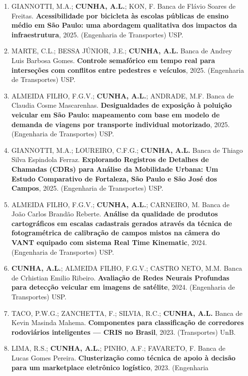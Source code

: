 \documentclass[
  brazilian,
  11pt,
  a4paper,
]{article}
\begin{document}
\begin{enumerate}
\def\labelenumi{\arabic{enumi}.}
\item
  GIANNOTTI, M.A.; \textbf{CUNHA, A.L.}; KON, F. Banca de Flávio Soares
  de Freitas. \textbf{Acessibilidade por bicicleta às escolas públicas
  de ensino médio em São Paulo: uma abordagem qualitativa dos impactos
  da infraestrutura}, 2025. (Engenharia de Transportes) USP.
\item
  MARTE, C.L.; BESSA JÚNIOR, J.E.; \textbf{CUNHA, A.L.} Banca de Andrey
  Luis Barbosa Gomes. \textbf{Controle semafórico em tempo real para
  interseções com conflitos entre pedestres e veículos}, 2025.
  (Engenharia de Transportes) USP.
\item
  ALMEIDA FILHO, F.G.V.; \textbf{CUNHA, A.L.}; ANDRADE, M.F. Banca de
  Claudia Cosme Mascarenhas. \textbf{Desigualdades de exposição à
  poluição veicular em São Paulo: mapeamento com base em modelo de
  demanda de viagens por transporte individual motorizado}, 2025.
  (Engenharia de Transportes) USP.
\item
  GIANNOTTI, M.A.; LOUREIRO, C.F.G.; \textbf{CUNHA, A.L.} Banca de
  Thiago Silva Espindola Ferraz. \textbf{Explorando Registros de
  Detalhes de Chamadas (CDRs) para Análise da Mobilidade Urbana: Um
  Estudo Comparativo de Fortaleza, São Paulo e São José dos Campos},
  2025. (Engenharia de Transportes) USP.
\item
  ALMEIDA FILHO, F.G.V.; \textbf{CUNHA, A.L.}; CARNEIRO, M. Banca de
  João Carlos Brandão Reberte. \textbf{Análise da qualidade de produtos
  cartográficos em escalas cadastrais gerados através da técnica de
  fotogramétrica de calibração de campos mistos na câmera do VANT
  equipado com sistema Real Time Kinematic}, 2024. (Engenharia de
  Transportes) USP.
\item
  \textbf{CUNHA, A.L.}; ALMEIDA FILHO, F.G.V.; CASTRO NETO, M.M. Banca
  de Crhistian Emilio Ribeiro. \textbf{Avaliação de Redes Neurais
  Profundas para detecção veicular em imagens de satélite}, 2024.
  (Engenharia de Transportes) USP.
\item
  TACO, P.W.G.; ZANCHETTA, F.; SILVIA, R.C.; \textbf{CUNHA, A.L.} Banca
  de Kevin Masinda Mahema. \textbf{Componentes para classificação de
  corredores rodoviários inteligentes --- CRIS no Brasil}, 2023.
  (Transportes) UnB.
\item
  LIMA, R.S.; \textbf{CUNHA, A.L.}; PINHO, A.F.; FAVARETO, F. Banca de
  Lucas Gomes Pereira. \textbf{Clusterização como técnica de apoio à
  decisão para um marketplace eletrônico logístico}, 2023. (Engenharia

\end{enumerate}
\end{document}
